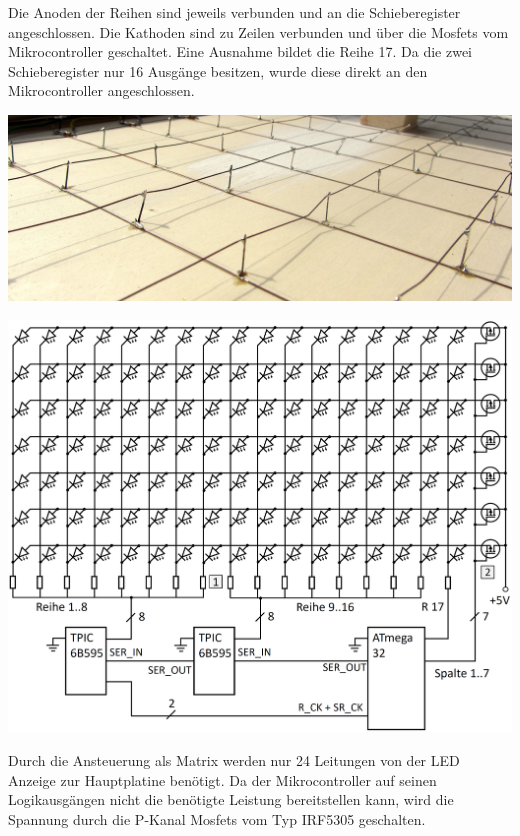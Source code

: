 Die Anoden der Reihen sind jeweils verbunden und an die Schieberegister
angeschlossen. Die Kathoden sind zu Zeilen verbunden und über die Mosfets vom
Mikrocontroller geschaltet. Eine Ausnahme bildet die Reihe 17. Da die zwei
Schieberegister nur 16 Ausgänge besitzen, wurde diese direkt an den Mikrocontroller
angeschlossen.
\begin{center}
	\includegraphics[width=\textwidth]{images/unterseite_drahtgitter.jpg} 
\end{center}
\label{led_matrix_verdrahtung}

\begin{center}
	\includegraphics[width=\textwidth]{skizzen/led_matrix_schaltplan.png} 
\end{center}
\label{led_matrix_schaltplan}

Durch die Ansteuerung als Matrix werden nur 24 Leitungen von der LED Anzeige zur
Hauptplatine benötigt. Da der Mikrocontroller auf seinen Logikausgängen nicht
die benötigte Leistung bereitstellen kann, wird die Spannung durch die P-Kanal
Mosfets vom Typ IRF5305 geschalten.

